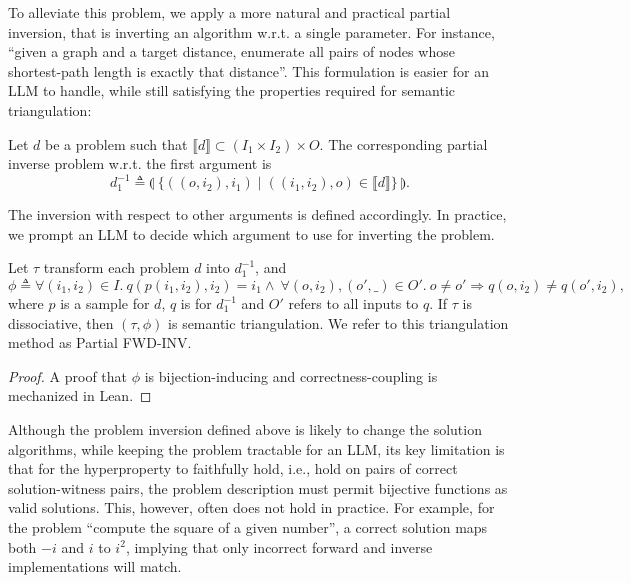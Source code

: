 \documentclass[acmsmall,screen,nonacm]{acmart}
\begin{document}
To alleviate this problem, we apply a more natural and practical partial inversion, that is inverting an algorithm w.r.t. a single parameter. For instance, ``given a graph and a target distance, enumerate all pairs of nodes whose shortest-path length is exactly that distance''. This formulation is easier for an LLM to handle, while still satisfying the properties required for semantic triangulation:


\begin{definition}
  Let $d$ be a problem such that $\llbracket d \rrbracket\subset (I_1 \times I_2) \times O$. The corresponding partial inverse problem w.r.t. the first argument is $$d^{-1}_1 \triangleq \llparenthesis\ \{((o, i_2), i_1) \mid ((i_1, i_2), o) \in \llbracket d \rrbracket\}\ \rrparenthesis.$$
\end{definition}

\noindent The inversion with respect to other arguments is defined accordingly. In practice, we prompt an LLM to decide which argument to use for inverting the problem.

\begin{proposition}\label{prop:partial_fwd_inv}
  Let $\tau$ transform each problem $d$ into $d^{-1}_1$, and $$\phi\triangleq \forall (i_1, i_2)\in I.\ q(p(i_1, i_2), i_2) = i_1 \wedge\ \forall (o, i_2), (o', \_)\in O'.\ o \neq o' \Rightarrow q(o, i_2) \neq q(o', i_2),$$ where $p$ is a sample for $d$, $q$ is for $d^{-1}_1$ and $O'$ refers to all inputs to $q$. If $\tau$ is dissociative, then $(\tau, \phi)$ is semantic triangulation. We refer to this triangulation method as Partial FWD-INV.
\end{proposition}

\begin{proof}
  A proof that $\phi$ is bijection-inducing and correctness-coupling is mechanized in Lean.
\end{proof}

Although the problem inversion defined above is likely to change the solution algorithms, while keeping the problem tractable for an LLM, its key limitation is that for the hyperproperty to faithfully hold, i.e., hold on pairs of correct solution-witness pairs, the problem description must permit bijective functions as valid solutions. This, however, often does not hold in practice. For example, for the problem ``compute the square of a given number'', a correct solution maps both $-i$ and $i$ to $i^2$, implying that only incorrect forward and inverse implementations will match.
\end{document}
